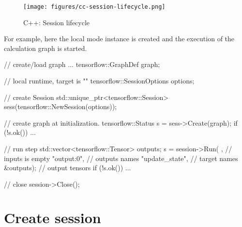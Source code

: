 \begin{content}
\begin{enum}
\end{enum}

\begin{figure}[H]
\centering
\texttt{[image: figures/cc-session-lifecycle.png]}
\caption{C++: Session lifecycle}
 \label{fig:cc-session-lifecycle}
\end{figure}

For example, here the local mode  instance is created and the execution of the calculation graph is started.

\begin{leftbar}
\begin{c++}
// create/load graph ...
tensorflow::GraphDef graph;

// local runtime, target is ""
tensorflow::SessionOptions options;

// create Session
std::unique_ptr<tensorflow::Session> 
sess(tensorflow::NewSession(options));

// create graph at initialization.
tensorflow::Status s = sess->Create(graph);
if (!s.ok()) { ... }

// run step
std::vector<tensorflow::Tensor> outputs;
s = session->Run(
  {},               // inputs is empty
  {"output:0"},     // outputs names
  {"update_state"}, // target names
  &outputs);        // output tensors
if (!s.ok()) { ... }

// close
session->Close();
\end{c++}
\end{leftbar}

\end{content}

\section{Create session}

